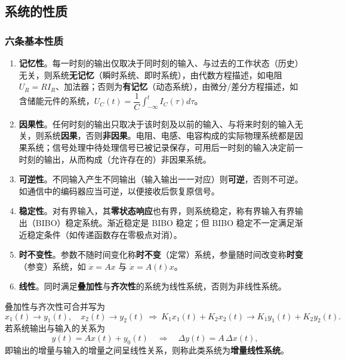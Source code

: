 \subsection{系统的性质}

\subsubsection{六条基本性质}
\begin{enumerate}
\item \textbf{记忆性}。每一时刻的输出仅取决于同时刻的输入、与过去的工作状态（历史）无关，则系统\textbf{无记忆}（瞬时系统、即时系统），由代数方程描述，如电阻 $U_R=RI_R$、加法器；否则为\textbf{有记忆}（动态系统），由微分/差分方程描述，如含储能元件的系统，$U_C(t)=\dfrac{1}{C}\displaystyle\int_{-\infty}^{t}I_C(\tau)d\tau$。
\item \textbf{因果性}。任何时刻的输出只取决于该时刻及以前的输入、与将来时刻的输入无关，则系统\textbf{因果}，否则\textbf{非因果}。电阻、电感、电容构成的实际物理系统都是因果系统；信号处理中待处理信号已被记录保存，可用后一时刻的输入决定前一时刻的输出，从而构成（允许存在的）非因果系统。
\item \textbf{可逆性}。不同输入产生不同输出（输入输出一一对应）则\textbf{可逆}，否则不可逆。如通信中的编码器应当可逆，以便接收后恢复原信号。
\item \textbf{稳定性}。对有界输入，其\textbf{零状态响应}也有界，则系统稳定，称有界输入有界输出（BIBO）稳定系统。渐近稳定是 BIBO 稳定；但 BIBO 稳定不一定满足渐近稳定条件（如传递函数存在零极点对消）。
\item \textbf{时不变性}。参数不随时间变化称\textbf{时不变}（定常）系统，参量随时间改变称\textbf{时变}（参变）系统，如 $\dot{x}=Ax$ 与 $\dot{x}=A(t)x$。
\item \textbf{线性}。同时满足\textbf{叠加性}与\textbf{齐次性}的系统为线性系统，否则为非线性系统。
\end{enumerate}

叠加性与齐次性可合并写为
\begin{equation}
x_1(t)\to y_1(t),\quad x_2(t)\to y_2(t)\ \Longrightarrow\ K_1x_1(t)+K_2x_2(t)\to K_1y_1(t)+K_2y_2(t).
\end{equation}
若系统输出与输入的关系为
\begin{equation}
y(t)=Ax(t)+y_0(t)\quad\Longrightarrow\quad \Delta y(t)=A\,\Delta x(t),
\end{equation}
即输出的增量与输入的增量之间呈线性关系，则称此类系统为\textbf{增量线性系统}。


